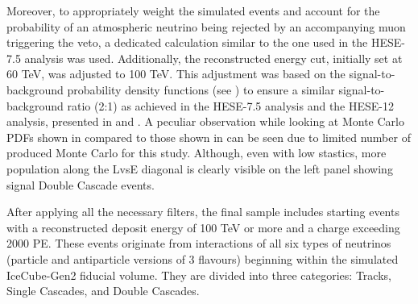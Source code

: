 Moreover, to appropriately weight the simulated events and account for the probability of an atmospheric neutrino being rejected by an accompanying muon triggering the veto, a dedicated calculation similar to the one used in the HESE-7.5 analysis  was used. Additionally, the reconstructed energy cut, initially set at 60 TeV, was adjusted to 100 TeV. This adjustment was based on the signal-to-background probability density functions (see ) to ensure a similar signal-to-background ratio (2:1) as achieved in the HESE-7.5 analysis  and the HESE-12 analysis, presented in  and . A peculiar observation while looking at Monte Carlo PDFs shown in  compared to those shown in  can be seen due to limited number of produced Monte Carlo for this study. Although, even with low stastics, more population along the LvsE diagonal is clearly visible on the left panel showing signal Double Cascade events. 

After applying all the necessary filters, the final sample includes starting events with a reconstructed deposit energy of 100 TeV or more and a charge exceeding 2000 PE. These events originate from interactions of all six types of neutrinos (particle and antiparticle versions of 3 flavours) beginning within the simulated IceCube-Gen2 fiducial volume. They are divided into three categories: Tracks, Single Cascades, and Double Cascades.

